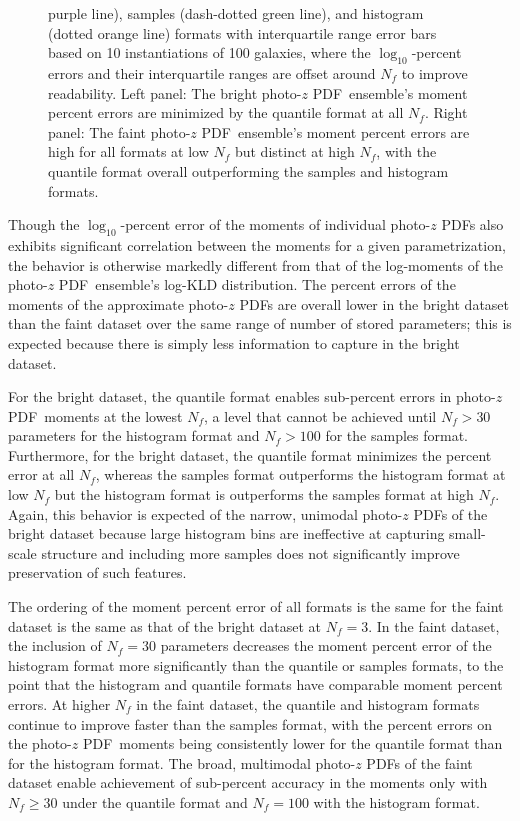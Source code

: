 \documentclass[\docopts]{\docclass}
\newcommand{\pz}{photo-$z$ PDF}
\newcommand{\mgdata}{bright\xspace}
\newcommand{\ssdata}{faint\xspace}
\begin{document}
\begin{figure}
\begin{center}
{purple line), samples (dash-dotted green line), and histogram (dotted orange 
line) formats with interquartile range error bars based on 10 instantiations of 
100 galaxies, where the $\log_{10}$-percent errors and their interquartile 
ranges are offset around $N_{f}$ to improve readability.
   Left panel: The \mgdata \pz\ ensemble's moment percent errors are minimized 
by the quantile format at all $N_{f}$.
   Right panel: The \ssdata \pz\ ensemble's moment percent errors are high for 
all formats at low $N_{f}$ but distinct at high $N_{f}$, with the quantile 
format overall outperforming the samples and histogram formats.
    \label{fig:pz_moment_errs}}
  \end{center}
\end{figure}

Though the $\log_{10}$-percent error of the moments of individual \pz s also 
exhibits significant correlation between the moments for a given 
parametrization, the behavior is otherwise markedly different from that of the 
log-moments of the \pz\ ensemble's log-KLD distribution.
The percent errors of the moments of the approximate \pz s are overall lower in 
the \mgdata dataset than the \ssdata dataset over the same range of number of 
stored parameters; this is expected because there is simply less information to 
capture in the \mgdata dataset.

For the \mgdata dataset, the quantile format enables sub-percent errors in \pz\ 
moments at the lowest $N_{f}$, a level that cannot be achieved until $N_{f}>30$ 
parameters for the histogram format and $N_{f}>100$ for the samples format.
Furthermore, for the \mgdata dataset, the quantile format minimizes the percent 
error at all $N_{f}$, whereas the samples format outperforms the histogram 
format at low $N_{f}$ but the histogram format is outperforms the samples 
format at high $N_{f}$.
Again, this behavior is expected of the narrow, unimodal \pz s of the \mgdata 
dataset because large histogram bins are ineffective at capturing small-scale 
structure and including more samples does not significantly improve 
preservation of such features.

The ordering of the moment percent error of all formats is the same for the 
\ssdata dataset is the same as that of the \mgdata dataset at $N_{f}=3$.
In the \ssdata dataset, the inclusion of $N_{f}=30$ parameters decreases the 
moment percent error of the histogram format more significantly than the 
quantile or samples formats, to the point that the histogram and quantile 
formats have comparable moment percent errors.
At higher $N_{f}$ in the \ssdata dataset, the quantile and histogram formats 
continue to improve faster than the samples format, with the percent errors on 
the \pz\ moments being consistently lower for the quantile format than for the 
histogram format.
The broad, multimodal \pz s of the \ssdata dataset enable achievement of 
sub-percent accuracy in the moments only with $N_{f}\geq30$ under the quantile 
format and $N_{f}=100$ with the histogram format.
\end{document}
